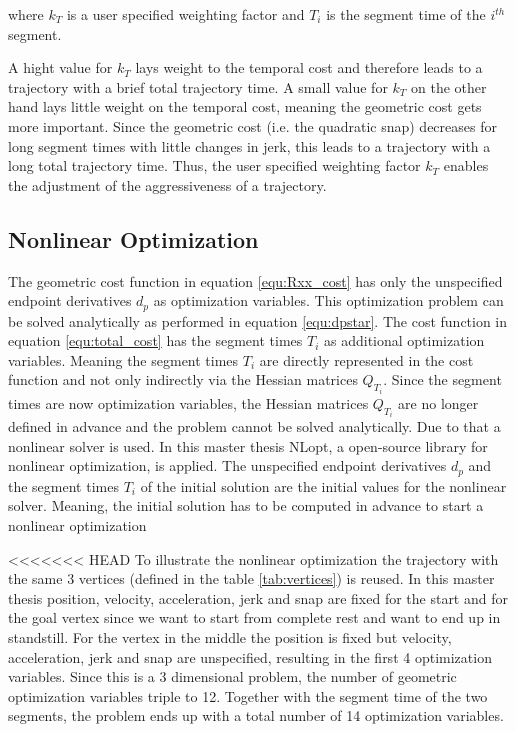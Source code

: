 where $k_T$ is a user specified weighting factor and $T_i$ is the segment time of the $i^{th}$ segment. \newline

A hight value for $k_T$ lays weight to the temporal cost and therefore leads to a trajectory with a brief total trajectory time. A small value for $k_T$ on the other hand lays little weight on the temporal cost, meaning the geometric cost gets more important. Since the geometric cost (i.e. the quadratic snap) decreases for long segment times with little changes in jerk, this leads to a trajectory with a long total trajectory time. Thus, the user specified weighting factor $k_T$ enables the adjustment of the aggressiveness of a trajectory. \newline

\subsection{Nonlinear Optimization}\label{sec:nonlinearopt}

The geometric cost function in equation \ref{equ:Rxx_cost} has only the unspecified endpoint derivatives $d_p$ as optimization variables. This optimization problem can be solved analytically as performed in equation \ref{equ:dpstar}. The cost function in equation \ref{equ:total_cost} has the segment times $T_i$ as additional optimization variables. Meaning the segment times $T_i$ are directly represented in the cost function and not only indirectly via the Hessian matrices $Q_{T_i}$. Since the segment times are now optimization variables, the Hessian matrices $Q_{T_i}$ are no longer defined in advance and the problem cannot be solved analytically. Due to that a nonlinear solver is used. In this master thesis NLopt, a open-source library for nonlinear optimization, is applied. The unspecified endpoint derivatives $d_p$ and the segment times $T_i$ of the initial solution are the initial values for the nonlinear solver. Meaning, the initial solution has to be computed in advance to start a nonlinear optimization \newline

<<<<<<< HEAD
To illustrate the nonlinear optimization the trajectory with the same 3 vertices (defined in the table  \ref{tab:vertices}) is reused. In this master thesis position, velocity, acceleration, jerk and snap are fixed for the start and for the goal vertex since we want to start from complete rest and want to end up in standstill. For the vertex in the middle the position is fixed but velocity, acceleration, jerk and snap are unspecified, resulting in the first 4 optimization variables. Since this is a 3 dimensional problem, the number of geometric optimization variables triple to 12. Together with the segment time of the two segments, the problem ends up with a total number of 14 optimization variables. \pagebreak 

